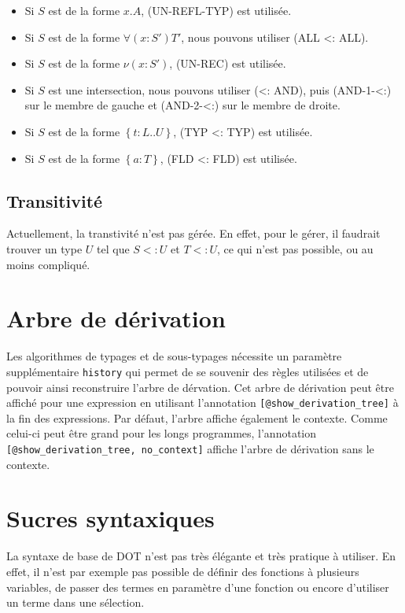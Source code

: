 \begin{itemize}
  \item Si $S$ est de la forme $x.A$, (UN-REFL-TYP) est utilisée.
  \item Si $S$ est de la forme $\forall(x : S') T'$, nous pouvons utiliser (ALL
    <: ALL).
  \item Si $S$ est de la forme $\nu(x : S')$, (UN-REC) est utilisée.
  \item Si $S$ est une intersection, nous pouvons utiliser (<: AND), puis
    (AND-1-<:) sur le membre de gauche et (AND-2-<:) sur le membre de droite.
  \item Si $S$ est de la forme $\left\{ t : L .. U \right\}$, (TYP <: TYP) est utilisée.
  \item Si $S$ est de la forme $\left\{ a : T \right\}$, (FLD <: FLD) est utilisée.
\end{itemize}

\subsection*{Transitivité}

Actuellement, la transtivité n'est pas gérée. En effet, pour le gérer, il
faudrait trouver un type $U$ tel que $S <: U$ et $T <: U$, ce qui n'est pas
possible, ou au moins compliqué.

\section{Arbre de dérivation}

Les algorithmes de typages et de sous-typages nécessite un paramètre
supplémentaire \verb|history| qui permet de se souvenir des règles
utilisées et de pouvoir ainsi reconstruire l'arbre de dérvation. Cet arbre de
dérivation peut être affiché pour une expression en utilisant l'annotation
\verb|[@show_derivation_tree]| à la fin des expressions. Par défaut, l'arbre
affiche également le contexte. Comme celui-ci peut être grand pour les
longs programmes, l'annotation \\ \verb|[@show_derivation_tree, no_context]|
affiche l'arbre de dérivation sans le contexte.

\section{Sucres syntaxiques}

La syntaxe de base de DOT n'est pas très élégante et très pratique à utiliser.
En effet, il n'est par exemple pas possible de définir des fonctions à plusieurs
variables, de passer des termes en paramètre d'une fonction ou encore d'utiliser
un terme dans une sélection.

